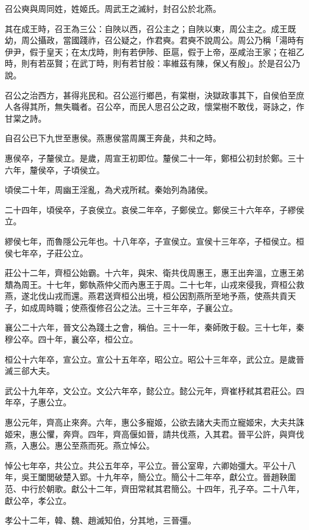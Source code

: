 
\begin{pinyinscope}
召公奭與周同姓，姓姬氏。周武王之滅紂，封召公於北燕。

其在成王時，召王為三公：自陜以西，召公主之；自陜以東，周公主之。成王既幼，周公攝政，當國踐祚，召公疑之，作君奭。君奭不說周公。周公乃稱「湯時有伊尹，假于皇天；在太戊時，則有若伊陟、臣扈，假于上帝，巫咸治王家；在祖乙時，則有若巫賢；在武丁時，則有若甘般：率維茲有陳，保乂有殷」。於是召公乃說。

召公之治西方，甚得兆民和。召公巡行鄉邑，有棠樹，決獄政事其下，自侯伯至庶人各得其所，無失職者。召公卒，而民人思召公之政，懷棠樹不敢伐，哥詠之，作甘棠之詩。

自召公已下九世至惠侯。燕惠侯當周厲王奔彘，共和之時。

惠侯卒，子釐侯立。是歲，周宣王初即位。釐侯二十一年，鄭桓公初封於鄭。三十六年，釐侯卒，子頃侯立。

頃侯二十年，周幽王淫亂，為犬戎所弒。秦始列為諸侯。

二十四年，頃侯卒，子哀侯立。哀侯二年卒，子鄭侯立。鄭侯三十六年卒，子繆侯立。

繆侯七年，而魯隱公元年也。十八年卒，子宣侯立。宣侯十三年卒，子桓侯立。桓侯七年卒，子莊公立。

莊公十二年，齊桓公始霸。十六年，與宋、衛共伐周惠王，惠王出奔溫，立惠王弟穨為周王。十七年，鄭執燕仲父而內惠王于周。二十七年，山戎來侵我，齊桓公救燕，遂北伐山戎而還。燕君送齊桓公出境，桓公因割燕所至地予燕，使燕共貢天子，如成周時職；使燕復修召公之法。三十三年卒，子襄公立。

襄公二十六年，晉文公為踐土之會，稱伯。三十一年，秦師敗于殽。三十七年，秦穆公卒。四十年，襄公卒，桓公立。

桓公十六年卒，宣公立。宣公十五年卒，昭公立。昭公十三年卒，武公立。是歲晉滅三郤大夫。

武公十九年卒，文公立。文公六年卒，懿公立。懿公元年，齊崔杼弒其君莊公。四年卒，子惠公立。

惠公元年，齊高止來奔。六年，惠公多寵姬，公欲去諸大夫而立寵姬宋，大夫共誅姬宋，惠公懼，奔齊。四年，齊高偃如晉，請共伐燕，入其君。晉平公許，與齊伐燕，入惠公。惠公至燕而死。燕立悼公。

悼公七年卒，共公立。共公五年卒，平公立。晉公室卑，六卿始彊大。平公十八年，吳王闔閭破楚入郢。十九年卒，簡公立。簡公十二年卒，獻公立。晉趙鞅圍范、中行於朝歌。獻公十二年，齊田常弒其君簡公。十四年，孔子卒。二十八年，獻公卒，孝公立。

孝公十二年，韓、魏、趙滅知伯，分其地，三晉彊。


\end{pinyinscope}
